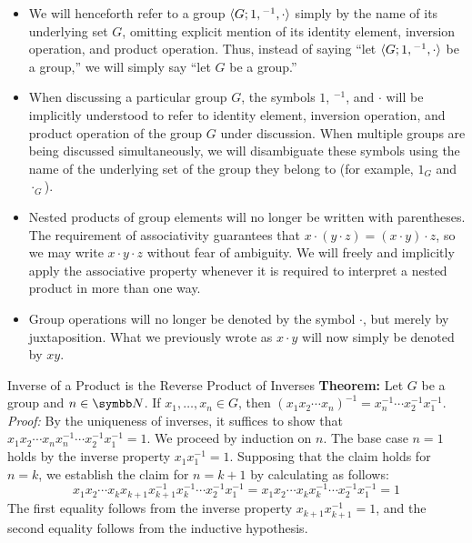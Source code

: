 \documentclass[12pt]{report}
\begin{document}
\begin{itemize}
	\item We will henceforth refer to a group ${\langle {G; 1, {}^{-1}, \cdot} \rangle}$ simply by the name of its underlying set $G$, omitting explicit mention of its identity element, inversion operation, and product operation. Thus, instead of saying ``let ${\langle {G; 1, {}^{-1}, \cdot} \rangle}$ be a group,'' we will simply say ``let $G$ be a group.''
	\item When discussing a particular group $G$, the symbols $1$, ${}^{-1}$, and $\cdot$ will be implicitly understood to refer to identity element, inversion operation, and product operation of the group $G$ under discussion. When multiple groups are being discussed simultaneously, we will disambiguate these symbols using the name of the underlying set of the group they belong to (for example, $1_G$ and $\cdot_G$).
	\item Nested products of group elements will no longer be written with parentheses. The requirement of associativity guarantees that $x \cdot (y \cdot z) = (x \cdot y) \cdot z$, so we may write $x \cdot y \cdot z$ without fear of ambiguity. We will freely and implicitly apply the associative property whenever it is required to interpret a nested product in more than one way.
	\item Group operations will no longer be denoted by the symbol $\cdot$, but merely by juxtaposition. What we previously wrote as $x \cdot y$ will now simply be denoted by $xy$.
\end{itemize}

\begin{thmbox}{Inverse of a Product is the Reverse Product of Inverses}
	\textbf{Theorem:} Let $G$ be a group and $n \in \N$. If $x_1, \dots, x_n \in G$, then $(x_1 x_2 \cdots x_n)^{-1} = x_n^{-1} \cdots x_2^{-1} x_1^{-1}$.
\tcblower
	\textit{Proof:} By the uniqueness of inverses, it suffices to show that $x_1 x_2 \cdots x_n x_n^{-1} \cdots x_2^{-1} x_1^{-1} = 1$. We proceed by induction on $n$. The base case $n = 1$ holds by the inverse property $x_1 x_1^{-1} = 1$. Supposing that the claim holds for $n = k$, we establish the claim for $n = k + 1$ by calculating as follows:
	\[ x_1 x_2 \cdots x_k x_{k+1} x_{k+1}^{-1} x_k^{-1} \cdots x_2^{-1} x_1^{-1} = x_1 x_2 \cdots x_k x_k^{-1} \cdots x_2^{-1} x_1^{-1} = 1 \]
	The first equality follows from the inverse property $x_{k+1} x_{k+1}^{-1} = 1$, and the second equality follows from the inductive hypothesis.
\end{thmbox}
\end{document}

